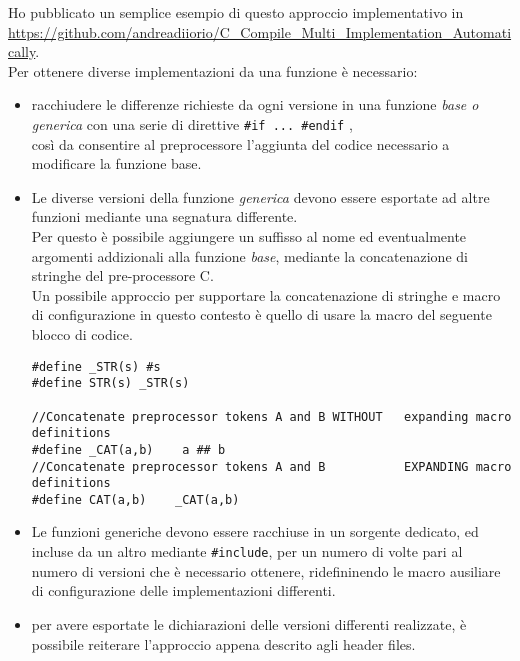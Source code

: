 Ho pubblicato un semplice esempio di questo approccio implementativo in \url{https://github.com/andreadiiorio/C_Compile_Multi_Implementation_Automatically}.\\
\voidLine
Per ottenere diverse implementazioni da una funzione è necessario:
\begin{itemize}
	\item	racchiudere le differenze richieste da ogni versione in una funzione \emph{base o generica} con una serie di direttive \verb|#if ... #endif| ,\\
			così da consentire al preprocessore l'aggiunta del codice necessario a modificare la funzione base.%
	\item	Le diverse versioni della funzione \emph{generica} devono essere esportate ad altre funzioni mediante una segnatura differente.\\
			Per questo è possibile aggiungere un  suffisso al nome ed eventualmente argomenti addizionali alla funzione 
			\emph{base}, mediante la concatenazione di stringhe del pre-processore C.\\
			Un possibile approccio per supportare la concatenazione di stringhe e macro di configurazione
			in questo contesto è quello di usare la macro  del seguente blocco di codice.\\
			\begin{lstlisting}
#define _STR(s) #s
#define STR(s) _STR(s)

//Concatenate preprocessor tokens A and B WITHOUT   expanding macro definitions
#define _CAT(a,b)    a ## b
//Concatenate preprocessor tokens A and B           EXPANDING macro definitions
#define CAT(a,b)    _CAT(a,b)
			\end{lstlisting}
	\item	Le funzioni generiche devono essere racchiuse in un sorgente dedicato, ed incluse da un altro mediante \verb|#include|,
			per un numero di volte pari al numero di versioni che è necessario ottenere,
			ridefininendo le macro ausiliare di configurazione delle implementazioni differenti.
	\item	per avere esportate le dichiarazioni delle versioni differenti realizzate, è possibile reiterare l'approccio 
			appena descrito agli header files.
\end{itemize}
 
